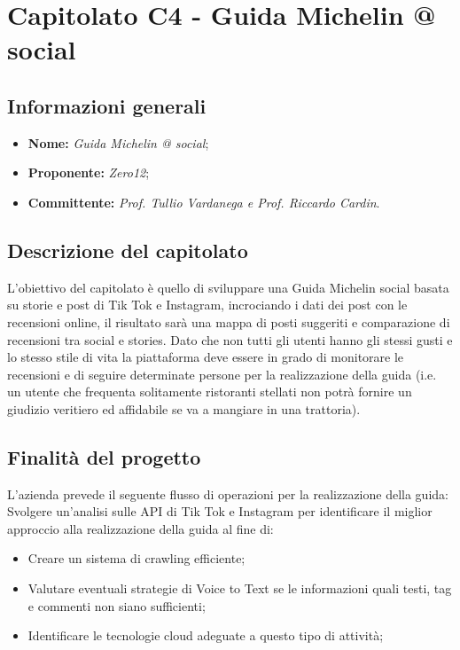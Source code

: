 \section{Capitolato C4 - Guida Michelin @ social}\label{section:c4}

\subsection {Informazioni generali}
    \begin{itemize}
        \item \textbf{Nome:} \textit{Guida Michelin @ social};
        \item \textbf{Proponente:} \textit{Zero12};
        \item \textbf{Committente:} \textit{Prof. Tullio Vardanega e Prof. Riccardo Cardin}.
    \end{itemize}

\subsection{Descrizione del capitolato}
    L'obiettivo del capitolato è quello di sviluppare una Guida Michelin social basata su storie e post di Tik Tok e Instagram, incrociando i dati dei post con le recensioni online, il risultato sarà una mappa di posti suggeriti e comparazione di recensioni tra social e stories.
    Dato che non tutti gli utenti hanno gli stessi gusti e lo stesso stile di vita la piattaforma deve essere in grado di monitorare le recensioni e di seguire determinate persone per la realizzazione della guida (i.e. un utente che frequenta solitamente ristoranti stellati non potrà fornire un giudizio veritiero ed affidabile se va a mangiare in una trattoria).

\subsection {Finalità del progetto}
    L'azienda prevede il seguente flusso di operazioni per la realizzazione della guida:
    Svolgere un'analisi sulle API di Tik Tok e Instagram per identificare il miglior approccio alla realizzazione della guida al fine di: 
    \begin{itemize}
        \item Creare un sistema di crawling efficiente;
        \item Valutare eventuali strategie di Voice to Text se le informazioni quali testi, tag e commenti non siano sufficienti;
        \item Identificare le tecnologie cloud adeguate a questo tipo di attività;
\end{itemize}


